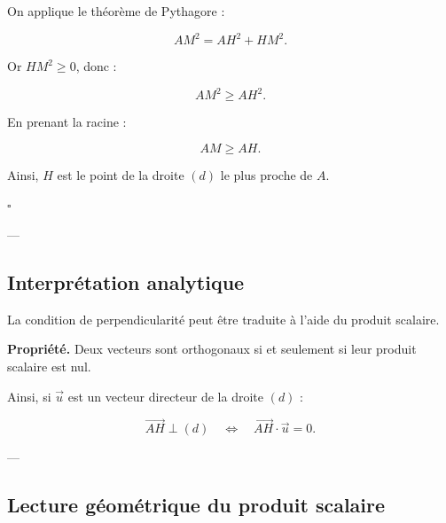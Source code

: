 \documentclass[11pt,a4paper]{article}
\begin{document}
On applique le théorème de Pythagore :

\[
AM^2 = AH^2 + HM^2.
\]

Or $HM^2 \geq 0$, donc :

\[
AM^2 \geq AH^2.
\]

En prenant la racine :

\[
AM \geq AH.
\]

\bigskip

Ainsi, $H$ est le point de la droite $(d)$ le plus proche de $A$.

\hfill $\square$

---

\subsection{Interprétation analytique}

La condition de perpendicularité peut être traduite à l’aide du produit scalaire.

\bigskip

\textbf{Propriété.}  
Deux vecteurs sont orthogonaux si et seulement si leur produit scalaire est nul.

\bigskip

Ainsi, si $\vec{u}$ est un vecteur directeur de la droite $(d)$ :

\[
\vec{AH} \perp (d)
\quad \Longleftrightarrow \quad
\vec{AH} \cdot \vec{u} = 0.
\]

---

\subsection{Lecture géométrique du produit scalaire}

\begin{center}
\end{center}

\bigskip
\end{document}
